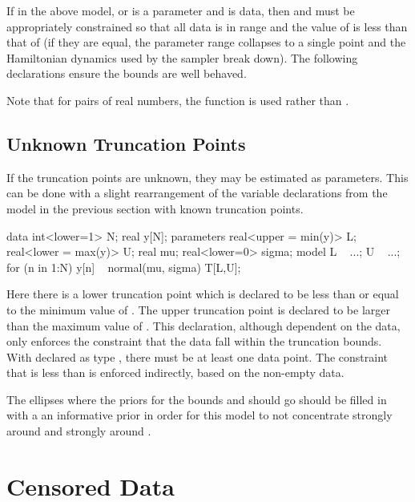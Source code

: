 If in the above model,  or  is a parameter and
 is data, then  and  must be appropriately
constrained so that all data is in range and the value of  is
less than that of  (if they are equal, the parameter range
collapses to a single point and the Hamiltonian dynamics used by 
the sampler break down).  The following declarations ensure the bounds
are well behaved.
%
\begin{stancode}
parameters {
  real<upper=min(y)> L; // L < y[n]
  real<lower=fmax(L, max(y))> U; // L < U; y[n] < U
\end{stancode}
%
Note that for pairs of real numbers, the function  is used
rather than .







\subsection{Unknown Truncation Points}

If the truncation points are unknown, they may be estimated as
parameters.  This can be done with a slight rearrangement of the
variable declarations from the model in the previous section with
known truncation points.
%
\begin{stancode}
data {
  int<lower=1> N;
  real y[N];
}
parameters {
  real<upper = min(y)> L; 
  real<lower = max(y)> U;
  real mu;
  real<lower=0> sigma;
}
model {
  L ~ ...;  
  U ~ ...;
  for (n in 1:N)
    y[n] ~ normal(mu, sigma) T[L,U];
}
\end{stancode}
%
Here there is a lower truncation point  which is declared to
be less than or equal to the minimum value of .  The upper
truncation point  is declared to be larger than the maximum
value of .  This declaration, although dependent on the data,
only enforces the constraint that the data fall within the truncation
bounds.  With  declared as type , there must be
at least one data point.  The constraint that  is less than
 is enforced indirectly, based on the non-empty data.

The ellipses where the priors for the bounds  and 
should go should be filled in with a an informative prior in
order for this model to not concentrate  strongly around 
 and  strongly around .


\section{Censored Data}

